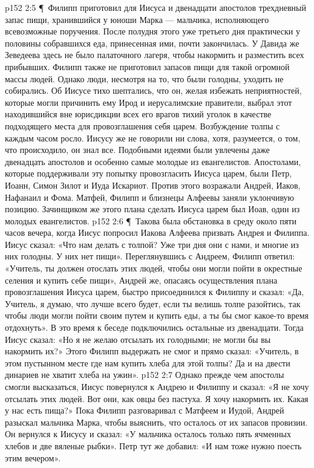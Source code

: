 \vs p152 2:5 \P\ Филипп приготовил для Иисуса и двенадцати апостолов трехдневный запас пищи, хранившийся у юноши Марка --- мальчика, исполняющего всевозможные поручения. После полудня этого уже третьего дня практически у половины собравшихся еда, принесенная ими, почти закончилась. У Давида же Зеведеева здесь не было палаточного лагеря, чтобы накормить и разместить всех прибывших. Филипп также не приготовил запасов пищи для такой огромной массы людей. Однако люди, несмотря на то, что были голодны, уходить не собирались. Об Иисусе тихо шептались, что он, желая избежать неприятностей, которые могли причинить ему Ирод и иерусалимские правители, выбрал этот находившийся вне юрисдикции всех его врагов тихий уголок в качестве подходящего места для провозглашения себя царем. Возбуждение толпы с каждым часом росло. Иисусу же не говорили ни слова, хотя, разумеется, о том, что происходило, он знал все. Подобными идеями были увлечены даже двенадцать апостолов и особенно самые молодые из евангелистов. Апостолами, которые поддерживали эту попытку провозгласить Иисуса царем, были Петр, Иоанн, Симон Зилот и Иуда Искариот. Против этого возражали Андрей, Иаков, Нафанаил и Фома. Матфей, Филипп и близнецы Алфеевы заняли уклончивую позицию. Зачинщиком же этого плана сделать Иисуса царем был Иоав, один из молодых евангелистов.
\vs p152 2:6 \P\ Такова была обстановка в среду около пяти часов вечера, когда Иисус попросил Иакова Алфеева призвать Андрея и Филиппа. Иисус сказал: «Что нам делать с толпой? Уже три дня они с нами, и многие из них голодны. У них нет пищи». Переглянувшись с Андреем, Филипп ответил: «Учитель, ты должен отослать этих людей, чтобы они могли пойти в окрестные селения и купить себе пищи», Андрей же, опасаясь осуществления плана провозглашения Иисуса царем, быстро присоединился к Филиппу и сказал: «Да, Учитель, я думаю, что лучше всего будет, если ты велишь толпе разойтись, так чтобы люди могли пойти своим путем и купить еды, а ты бы смог какое\hyp{}то время отдохнуть». В это время к беседе подключились остальные из двенадцати. Тогда Иисус сказал: «Но я не желаю отсылать их голодными; не могли бы вы накормить их?» Этого Филипп выдержать не смог и прямо сказал: «Учитель, в этом пустынном месте где нам купить хлеба для этой толпы? Да и на двести динариев не хватит хлеба на ужин».
\vs p152 2:7 Однако прежде чем апостолы смогли высказаться, Иисус повернулся к Андрею и Филиппу и сказал: «Я не хочу отсылать этих людей. Вот они, как овцы без пастуха. Я хочу накормить их. Какая у нас есть пища?» Пока Филипп разговаривал с Матфеем и Иудой, Андрей разыскал мальчика Марка, чтобы выяснить, что осталось от их запасов провизии. Он вернулся к Иисусу и сказал: «У мальчика осталось только пять ячменных хлебов и две вяленые рыбки». Петр тут же добавил: «И нам тоже нужно поесть этим вечером».
